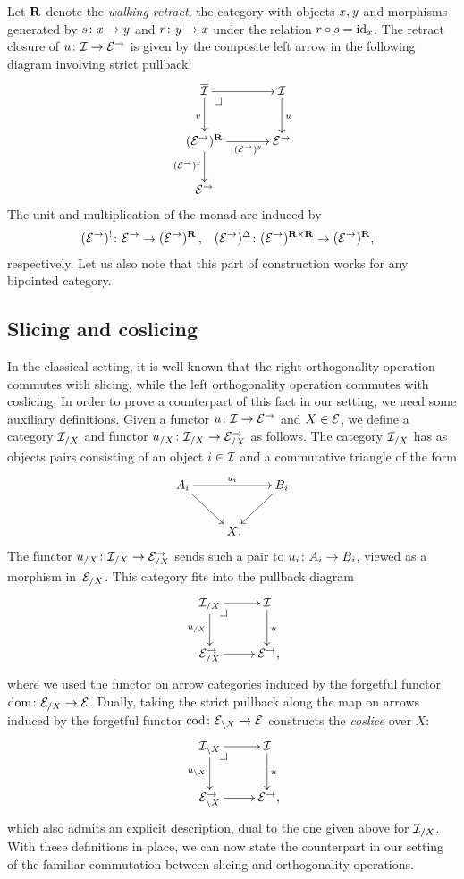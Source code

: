 \documentclass[reqno,10pt,a4paper,oneside,draft]{amsart}
\begin{document}
\begin{remark}
Let $\ret$ denote the \emph{walking retract}, \ie the category with objects $\retA, \retB$ and morphisms generated by $s \co \retA \to \retB$ and $r \co \retB \to \retA$ under the relation $r \cc s = \id_{\retA}$.
The retract closure of $u \co \cal{I} \to \catE^\to$ is given by the composite left arrow in the following diagram involving strict pullback:
\[
\xymatrix@C+1em{
  \overline{\cal{I}}
  \ar[r]
  \ar[d]_v
  \pullback{dr}
&
  \cal{I}
  \ar[d]^{u}
\\
  (\catE^\to)^{\ret}
  \ar[r]_-{(\catE^\to)^{\retB}}
  \ar[d]_{(\catE^\to)^\retA}
&
  \catE^\to
\\
  \catE^\to
}
\]
The unit and multiplication of the monad are induced by
\[
\begin{aligned}
  (\catE^\to)^{\canonical} &\co \catE^\to \to (\catE^\to)^{\ret}
\, ,&
  (\catE^\to)^{\Delta} &\co (\catE^\to)^{\ret \times \ret} \to (\catE^\to)^{\ret}
\rlap{,}
\end{aligned}
\]
respectively.
Let us also note that this part of construction works for any bipointed category.
\end{remark}

\subsection*{Slicing and coslicing}

In the classical setting, it is well-known that the right orthogonality operation commutes with slicing, while the left orthogonality operation commutes with coslicing.
In order to prove a counterpart of this fact in our setting, we need some auxiliary definitions.
Given a functor $u \co \cal{I} \to \catE^\to$ and $X \in \catE$, we define a category $\cal{I}_{/X}$ and functor $u_{/X} \co \cal{I}_{/X} \to \catE_{/X}^\to$ as follows.
The category $\cal{I}_{/X}$ has as objects pairs consisting of an object $i \in \cal{I}$ and a commutative triangle of the form
\[
\xymatrix{
  A_i
  \ar[dr]
  \ar[rr]^{u_i}
&&
  B_i
  \ar[dl]
\\&
  X
\rlap{.}}
\]
The functor $u_{/X} \co \cal{I}_{/X} \to \catE_{/X}^\to$ sends such a pair to $u_i \co A_i \to B_i$, viewed as a morphism in~$\catE_{/X}$.
This category fits into the pullback diagram
\[
\xymatrix{
  \cal{I}_{/X}
  \ar[r]
  \ar[d]_{u_{/X}}
  \pullback{dr}
&
  \cal{I}
  \ar[d]^{u}
\\
  \catE_{/X}^\to
  \ar[r]
&
  \catE^\to
\rlap{,}}
\]
where we used the functor on arrow categories induced by the forgetful functor $\dom \co \catE_{/X} \to \catE$.
Dually, taking the strict pullback along the map on arrows induced by the forgetful functor $\operatorname{cod} \co \catE_{\backslash X} \to \catE$ constructs the \emph{coslice} over $X$:
\[
\xymatrix{
  \cal{I}_{\backslash X}
  \ar[r]
  \ar[d]_{u_{\backslash X}}
  \pullback{dr}
&
  \cal{I}
  \ar[d]^{u}
\\
  \catE_{\backslash X}^\to
  \ar[r]
&
  \catE^\to
\rlap{,}}
\]
which also admits an explicit description, dual to the one given above for $\cal{I}_{/X}$.
With these definitions in place, we can now state the counterpart in our setting of the familiar commutation between slicing and orthogonality operations.
\end{document}
